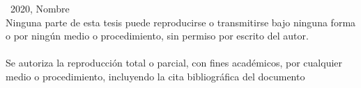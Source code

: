 \documentclass[spanish, a4paper, 12pt, twoside, openany]{book}
\numberwithin{equation}{section}                %
\def\biblio{\clearpage} %
\begin{document}
\def\biblio{}   %

\vfill

\thispagestyle{empty}
\mbox{}                         %
\vfill                          %
\textcopyright\ 2020, Nombre \\ %
Ninguna parte de esta tesis puede reproducirse o transmitirse bajo ninguna forma o por ningún medio o procedimiento, sin permiso por escrito del autor.\\\\
Se autoriza la reproducción total o parcial, con fines académicos, por cualquier medio o procedimiento, incluyendo la cita bibliográfica del documento
\vspace{1cm}    %
\restoregeometry %








\restoregeometry        %


\end{document}
